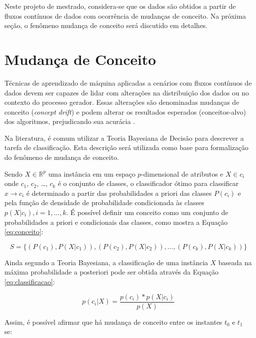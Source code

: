 \documentclass[qual, classic, a4paper]{ufbathesis}
\begin{document}
Neste projeto de mestrado, considera-se que os dados são obtidos a partir de fluxos contínuos de dados com ocorrência de mudanças de conceito.
Na próxima seção, o fenômeno mudança de conceito será discutido em detalhes.

\section{Mudança de Conceito}
\label{sec:mudanca_de_conceito}

Técnicas de aprendizado de máquina aplicadas a cenários com fluxos contínuos de dados devem ser capazes de lidar com alterações na distribuição dos dados ou no contexto do processo gerador.
Essas alterações são denominadas mudanças de conceito (\textit{concept drift}) e podem alterar os resultados esperados (conceitos-alvo) dos algoritmos, prejudicando sua acurácia \cite{Widmer:1996:LPC:226791.226798}.

Na literatura, é comum utilizar a Teoria Bayesiana de Decisão \cite{Duda:2000:PC:954544} para descrever a tarefa de classificação.
Esta descrição será utilizada como base para formalização do fenômeno de mudança de conceito.

Sendo $X \in \mathbb{R}^p$ uma instância em um espaço $p$-dimensional de atributos e $X \in c_i$ onde $c_1$, $c_2$, \ldots, $c_k$ é o conjunto de classes, 
o classificador ótimo para classificar $x \rightarrow c_i$ é determinado a partir das probabilidades a priori das classes $P(c_i)$ e pela função de densidade de probabilidade condicionada às classes $p(X|c_i), i = 1, \ldots, k$.
É possível definir um conceito como um conjunto de probabilidades a priori e condicionais das classes, como mostra a Equação \ref{eq:conceito}:

\begin{equation} \label{eq:conceito}
    S = \{(P(c_1), P(X|c_1)), (P(c_2), P(X|c_2)), ..., (P(c_k), P(X|c_k))\}
\end{equation}

Ainda segundo a Teoria Bayesiana, a classificação de uma instância $X$ baseada na máxima probabilidade a posteriori pode ser obtida através da Equação \ref{eq:classificacao}:

\begin{equation} \label{eq:classificacao}
    p(c_i|X) = \frac{p(c_i) * p(X|c_i)}{p(X)}
\end{equation}

Assim, é possível afirmar que há mudança de conceito entre os instantes $t_0$ e $t_1$ se:
\end{document}

